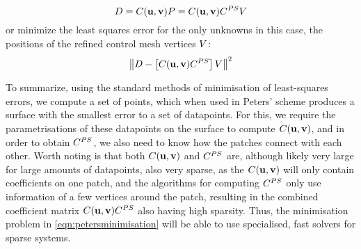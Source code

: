 \begin{equation}
\lsDataPointMatrix = \lsControlPointCoefMatrix(\vec{u},\vec{v})\lsControlPointMatrix = \lsControlPointCoefMatrix(\vec{u},\vec{v})\petersControlPointCoefMatrix\petersPatchPointMatrix
\end{equation}
or minimize the least squares error for the only unknowns in this case, the positions of the refined control mesh vertices $\petersPatchPointMatrix$:
\begin{equation}
\norm{\lsDataPointMatrix - \left [\lsControlPointCoefMatrix(\vec{u},\vec{v})\petersControlPointCoefMatrix\right ]\petersPatchPointMatrix}^2
\label{eqn:petersminimisation}
\end{equation}

To summarize, using the standard methods of minimisation of least-squares errors, we compute a set of points, which when used in Peters' scheme produces a surface with the smallest error to a set of datapoints. For this, we require the parametrisations of these datapoints on the surface to compute $\lsControlPointCoefMatrix(\vec{u},\vec{v})$, and in order to obtain $\petersControlPointCoefMatrix$, we also need to know how the patches connect with each other. 
Worth noting is that both $\lsControlPointCoefMatrix(\vec{u},\vec{v})$ and $\petersControlPointCoefMatrix$ are, although likely very large for large amounts of datapoints, also very sparse, as the $\lsControlPointCoefMatrix(\vec{u},\vec{v})$ will only contain coefficients on one patch, and the algorithms for computing $\petersControlPointCoefMatrix$ only use information of a few vertices around the patch, resulting in the combined coefficient matrix $\lsControlPointCoefMatrix(\vec{u},\vec{v})\petersControlPointCoefMatrix$ also having high sparsity. Thus, the minimisation problem in \autoref{eqn:petersminimisation} will be able to use specialised, fast solvers for sparse systems.


